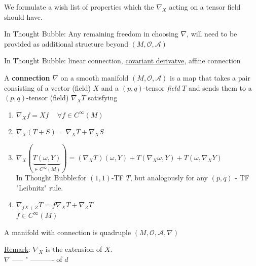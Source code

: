 We formulate a wish list of properties which the $\nabla_X$ acting on a tensor field should have. 

In Thought Bubble: Any remaining freedom in choosing $\nabla$, will need to be provided as additional structure beyond $(M, \mathcal{O}, \mathcal{A})$

\begin{definition}[connection] In Thought Bubble: linear connection, \underline{covariant derivatve}, affine connection
	 
	  A \textbf{connection} $\nabla$ on a smooth manifold $(M, \mathcal{O}, \mathcal{A})$ is a map that takes a pair consisting of a vector (field) $X$ and a $(p,q)$-tensor \emph{field} $T$ and sends them to a $(p,q)$-tensor (field) $\nabla_XT$ satisfying 


\begin{enumerate}
	\item[(i)] $\nabla_X f = Xf \quad \, \forall f \in C^{\infty}(M)$
	\item[(ii)] $\nabla_X(T+S) = \nabla_X T + \nabla_XS$
	\item[(iii)] $\nabla_X(\underbrace{T(\omega, Y)}_{\in C^{\infty}(M)}) = (\nabla_X T)(\omega, Y) + T(\nabla_X\omega, Y) + T(\omega, \nabla_XY)$ \\
In Thought Bubble:for $(1,1)$-TF $T$, but analogously for any $(p,q)$ - TF \\

"Leibnitz" rule.
			\item[(iv)] $\nabla_{fX+Z} T = f\nabla_X T + \nabla_Z T$ \\
	$ f\in C^{\infty}(M)$
\end{enumerate}
\end{definition} 


	
	A manifold with connection is quadruple $(M, \mathcal{O}, \mathcal{A}, \nabla)$ 

\underline{Remark}: $\nabla_X$ is the extension of $X$. \\
\phantom{Remark: } $\nabla $ ----- " ---------- of $d$
	

	

	

	


		

		

		








